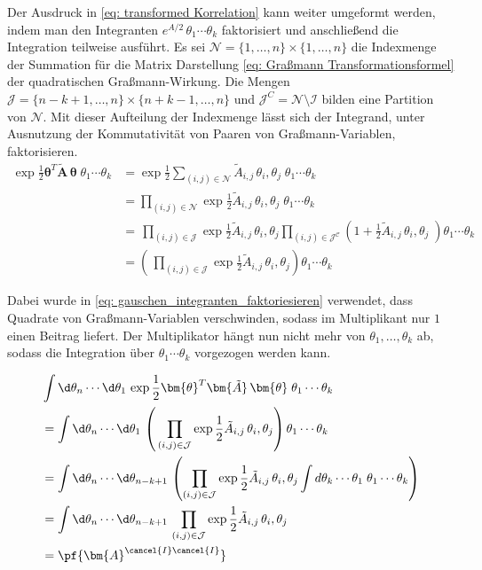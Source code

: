 \noindent Der Ausdruck in \eqref{eq: transformed Korrelation} kann weiter umgeformt werden, indem man den Integranten $e^{A/2}\,\theta_{1}\cdots\theta_k$ faktorisiert und anschließend die Integration teilweise ausführt. Es sei $\mathcal{N} = \{1,\dots,n\} \times \{1,\dots,n\}$ die Indexmenge der Summation für die Matrix Darstellung \eqref{eq: Graßmann Transformationsformel} der quadratischen Graßmann-Wirkung. Die Mengen $\mathcal{J} = \{n-k+1,\dots,n\} \times \{n+k-1,\dots,n\}$ und $\mathcal{J}^C = \mathcal{N} \setminus \mathcal{I} $ bilden eine Partition von $\mathcal{N}$. Mit dieser Aufteilung der Indexmenge lässt sich der Integrand, unter Ausnutzung der Kommutativität von Paaren von Graßmann-Variablen, faktorisieren.
\begin{align}
\exp{ \frac{1}{2} \bm{\theta}^T \bm{\tilde{A}}\, \bm{\theta}\;}  \theta_{1}\cdots\theta_k 
    & = \exp{ \frac{1}{2}\sum_{(i,j) \in \mathcal{N}} \tilde A_{i,j}\, \theta_i, \theta_j\;}  \theta_{1}\cdots\theta_k \nonumber\\
    & = \prod_{(i,j) \in \mathcal{N}} \exp{ \frac{1}{2} \tilde A_{i,j}\, \theta_i, \theta_j\;}  \theta_{1}\cdots\theta_k \nonumber \\
    & = \, \prod_{(i,j) \in \mathcal{J}} \exp{ \frac{1}{2} \tilde A_{i,j}\, \theta_i, \theta_j} \prod_{(i,j)\in \mathcal{J^C}} \left( 1 + \frac{1}{2} \tilde A_{i,j}\, \theta_i, \theta_j\;\right) \theta_{1}\cdots\theta_k \nonumber \\
     & = \left(\, \prod_{(i,j) \in \mathcal{J}} \exp{ \frac{1}{2} \tilde A_{i,j}\, \theta_i, \theta_j}\right) \theta_{1}\cdots\theta_k  \label{eq: gauschen_integranten_faktoriesieren}
\end{align}

\noindent Dabei wurde in \eqref{eq: gauschen_integranten_faktoriesieren} verwendet, dass Quadrate von Graßmann-Variablen verschwinden, sodass im Multiplikant nur $1$ einen Beitrag liefert. Der Multiplikator hängt nun nicht mehr von $\theta_{1},\dots,\theta_k$ ab, sodass die Integration über $\theta_{1}\cdots\theta_k$ vorgezogen werden kann.

\begin{align}
    &\int \d \theta_n \cdots \d \theta_1\, \exp{ \frac{1}{2} \bm{\theta}^T \bm{\tilde{A}}\, \bm{\theta}\;}  \theta_{1}\cdots\theta_k \nonumber\\
    &=\int \d \theta_n \cdots \d \theta_1\, \left(\, \prod_{(i,j) \in \mathcal{J}} \exp{ \frac{1}{2} \tilde A_{i,j}\, \theta_i, \theta_j}\right) \theta_{1}\cdots\theta_k \nonumber \\
    &=  \int \d\theta_n \cdots \d\theta_{n-k+1} \, \left(\prod_{(i,j) \in \mathcal{J}} \exp{ \frac{1}{2} \tilde A_{i,j}\, \theta_i, \theta_j} \int d\theta_k \cdots \theta_{1} \; \theta_{1}\cdots\theta_k \right) \nonumber \\
    &=  \int \d \theta_n \cdots \d\theta_{n-k+1} \, \prod_{(i,j) \in \mathcal{J}} \exp{ \frac{1}{2} \tilde A_{i,j}\, \theta_i, \theta_j} \nonumber \\
    &= \pf{\bm{A}^{\cancel{I} \cancel{I}}} \nonumber
\end{align}

